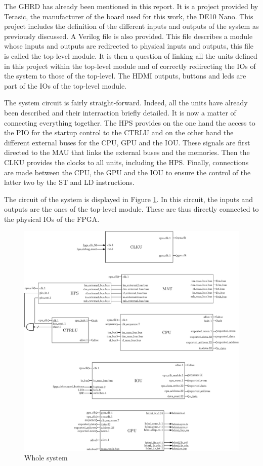 The GHRD has already been mentioned in this report. It is a project provided by Terasic, the 
manufacturer of the board used for this work, the DE10 Nano. This project includes the definition 
of the different inputs and outputs of the system as previously discussed. A Verilog file is also 
provided. This file describes a module whose inputs and outputs are redirected to physical inputs 
and outputs, this file is called the top-level module. It is then a question of linking all the 
units defined in this project within the top-level module and of correctly redirecting the IOs of 
the system to those of the top-level. The HDMI outputs, buttons and leds are part of the IOs of the
top-level module.

The system circuit is fairly straight-forward. Indeed, all the units have already been described 
and their interraction briefly detailed. It is now a matter of connecting everything together. The 
HPS provides on the one hand the access to the PIO for the startup control to the CTRLU and 
on the other hand the different external buses for the CPU, GPU and the IOU. These signals are first
directed to the MAU that links the external buses and the memories. Then the CLKU provides the 
clocks to all units, including the HPS. Finally, connections are made between the CPU, the GPU and 
the IOU to ensure the control of the latter two by the ST and LD instructions.

The circuit of the system is displayed in Figure \ref{fig:system/system}. In this circuit, the inputs
and outputs are the ones of the top-level module. These are thus directly connected to the physical
IOs of the FPGA.

\begin{figure}[H]
    \centering
    \includegraphics[width=\linewidth]{Chapter6-System/res/system.eps}
    \caption{Whole system}
    \label{fig:system/system}
\end{figure}

